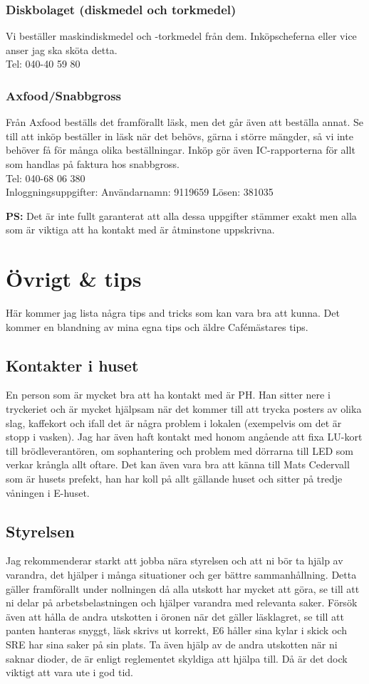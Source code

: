\documentclass[10pt]{article}
\begin{document}
\subsubsection*{Diskbolaget (diskmedel och torkmedel)}
Vi beställer maskindiskmedel och -torkmedel från dem. Inköpscheferna eller vice anser jag ska sköta detta.\\
Tel: {040-40 59 80}

\subsubsection*{Axfood/Snabbgross}
Från Axfood beställs det framförallt läsk, men det går även att beställa annat. Se till att inköp beställer in läsk när det behövs, gärna i större mängder, så vi inte behöver få för många olika beställningar. Inköp gör även IC-rapporterna för allt som handlas på faktura hos snabbgross.\\
Tel: {040-68 06 380}\\
Inloggningsuppgifter: Användarnamn: {9119659} Lösen: {381035}

\textbf{PS:} Det är inte fullt garanterat att alla dessa uppgifter stämmer exakt men alla som är viktiga att ha kontakt med är åtminstone uppskrivna.

\section{Övrigt \& tips}
Här kommer jag lista några tips and tricks som kan vara bra att kunna. Det kommer en blandning av mina egna tips och äldre Cafémästares tips.

\subsection{Kontakter i huset}
En person som är mycket bra att ha kontakt med är PH. Han sitter nere i tryckeriet och är mycket hjälpsam när det kommer till att trycka posters av olika slag, kaffekort och ifall det är några problem i lokalen (exempelvis om det är stopp i vasken). Jag har även haft kontakt med honom angående att fixa LU-kort till brödleverantören, om sophantering och problem med dörrarna till LED som verkar krångla allt oftare.
Det kan även vara bra att känna till Mats Cedervall som är husets prefekt, han har koll på allt gällande huset och sitter på tredje våningen i E-huset.

\subsection{Styrelsen}
Jag rekommenderar starkt att jobba nära styrelsen och att ni bör ta hjälp av varandra, det hjälper i många situationer och ger bättre sammanhållning. Detta gäller framförallt under nollningen då alla utskott har mycket att göra, se till att ni delar på arbetsbelastningen och hjälper varandra med relevanta saker. Försök även att hålla de andra utskotten i öronen när det gäller läsklagret, se till att panten hanteras snyggt, läsk skrivs ut korrekt, E6 håller sina kylar i skick och SRE har sina saker på sin plats. Ta även hjälp av de andra utskotten när ni saknar dioder, de är enligt reglementet skyldiga att hjälpa till. Då är det dock viktigt att vara ute i god tid.
\end{document}
